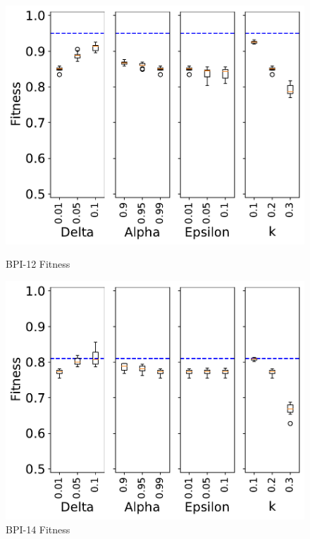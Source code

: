 \documentclass[landscape]{article}
\begin{document}
\begin{figure}[!htb]
	\centering
	\begin{minipage}{0.2\textwidth}
		\includegraphics[width=1.0\textwidth]{../BPI_Challenge_2012/BPI_Challenge_2012_param_fitness_Approx_k02.pdf}
		\caption{BPI-12 Fitness}
	\end{minipage}
	\hfill
	\begin{minipage}{0.2\textwidth}
		\includegraphics[width=1.0\textwidth]{../Detail_Incident_Activity/Detail_Incident_Activity_param_fitness_Approx_k02.pdf}
		\caption{BPI-14 Fitness}
	\end{minipage}
	\hfill

\end{figure}
\end{document}

